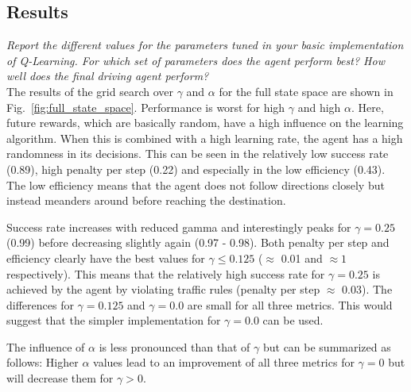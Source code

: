 \documentclass[11pt]{article}
\begin{document}
\subsection{Results}
\textit{Report the different values for the parameters tuned in your basic implementation of Q-Learning. For which set of parameters does the agent perform best? How well does the final driving agent perform?}\\

The results of the grid search over $\gamma$ and $\alpha$ for the full state space are shown in Fig.~\ref{fig:full_state_space}. Performance is worst for high $\gamma$ and high $\alpha$. Here, future rewards, which are basically random, have a high influence on the learning algorithm. When this is combined with a high learning rate, the agent has a high randomness in its decisions. This can be seen in the relatively low success rate (0.89), high penalty per step (0.22) and especially in the low efficiency (0.43). The low efficiency means that the agent does not follow directions closely but instead meanders around before reaching the destination.

Success rate increases with reduced gamma and interestingly peaks for $\gamma = 0.25$ (0.99) before decreasing slightly again (0.97 - 0.98). Both penalty per step and efficiency clearly have the best values for $\gamma \le 0.125$ ($\approx$ 0.01 and $\approx 1$ respectively). This means that the relatively high success rate for $\gamma = 0.25$ is achieved by the agent by violating traffic rules (penalty per step $\approx$ 0.03). The differences for $\gamma = 0.125$ and $\gamma = 0.0$ are small for all three metrics. This would suggest that the simpler implementation for $\gamma = 0.0$ can be used. 

The influence of $\alpha$ is less pronounced than that of $\gamma$ but can be summarized as follows: Higher $\alpha$ values lead to an improvement of all three metrics for $\gamma = 0$ but will decrease them for $\gamma > 0$. 
\end{document}
